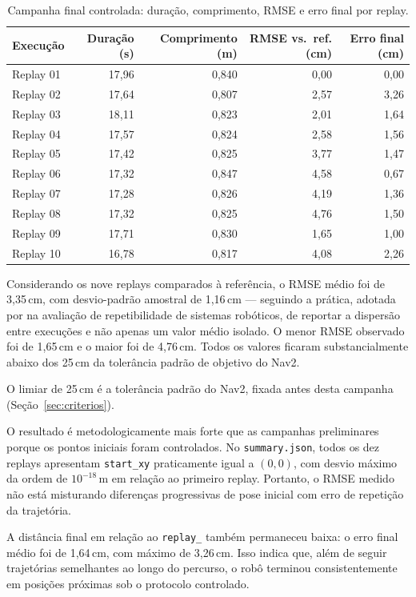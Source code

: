 \begin{table}[H]
\centering
\caption{Campanha final controlada: duração, comprimento, RMSE e erro final por replay.}
\label{tab:campanha_final}
\footnotesize
\begin{tabular}{lrrrr}
\toprule
\textbf{Execução} & \textbf{Duração (s)} & \textbf{Comprimento (m)} & \textbf{RMSE vs.\ ref. (cm)} & \textbf{Erro final (cm)} \\
\midrule
Replay 01 & 17,96 & 0,840 & 0,00 & 0,00 \\
Replay 02 & 17,64 & 0,807 & 2,57 & 3,26 \\
Replay 03 & 18,11 & 0,823 & 2,01 & 1,64 \\
Replay 04 & 17,57 & 0,824 & 2,58 & 1,56 \\
Replay 05 & 17,42 & 0,825 & 3,77 & 1,47 \\
Replay 06 & 17,32 & 0,847 & 4,58 & 0,67 \\
Replay 07 & 17,28 & 0,826 & 4,19 & 1,36 \\
Replay 08 & 17,32 & 0,825 & 4,76 & 1,50 \\
Replay 09 & 17,71 & 0,830 & 1,65 & 1,00 \\
Replay 10 & 16,78 & 0,817 & 4,08 & 2,26 \\
\bottomrule
\end{tabular}
\end{table}

Considerando os nove replays comparados à referência, o RMSE médio foi de
3,35\,cm, com desvio-padrão amostral de 1,16\,cm --- seguindo a prática, adotada por
 na avaliação de repetibilidade de sistemas robóticos,
de reportar a dispersão entre execuções e não apenas um valor médio isolado.
O menor RMSE observado foi de 1,65\,cm e o maior foi de 4,76\,cm. Todos os
valores ficaram substancialmente abaixo dos 25\,cm da tolerância padrão de
objetivo do Nav2.

O limiar de 25\,cm é a tolerância padrão do Nav2, fixada antes desta campanha
(Seção~\ref{sec:criterios}).

O resultado é metodologicamente mais forte que as campanhas preliminares porque
os pontos iniciais foram controlados. No \texttt{summary.json}, todos os dez
replays apresentam \texttt{start\_\allowbreak xy} praticamente igual a $(0,0)$,
com desvio máximo da ordem de $10^{-18}$\,m em relação ao primeiro replay.
Portanto, o RMSE medido não está misturando diferenças progressivas de pose
inicial com erro de repetição da trajetória.

A distância final em relação ao \texttt{replay\_} também permaneceu
baixa: o erro final médio foi de 1,64\,cm, com máximo de 3,26\,cm. Isso indica
que, além de seguir trajetórias semelhantes ao longo do percurso, o robô terminou
consistentemente em posições próximas sob o protocolo controlado.

